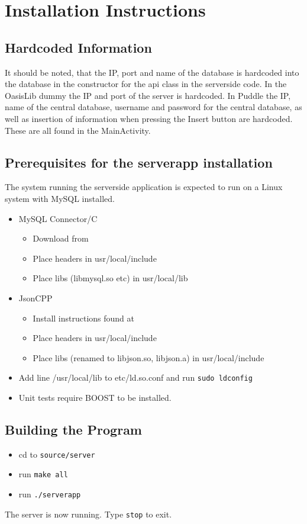 \section{Installation Instructions}

\subsection{Hardcoded Information}
It should be noted, that the IP, port and name of the database is hardcoded into the database in the constructor for the \ac{api} class in the serverside code. In the OasisLib dummy the IP and port of the server is hardcoded. In Puddle the IP, name of the central database, username and password for the central database, as well as insertion of information when pressing the Insert button are hardcoded. These are all found in the MainActivity.

\subsection{Prerequisites for the serverapp installation}
The system running the serverside application is expected to run on a Linux system with MySQL installed.

\begin{itemize}
\item MySQL Connector/C
\begin{itemize}
	\item Download from \cite{mysqlconnector}
	\item Place headers in usr/local/include
	\item Place libs (libmysql.so etc) in usr/local/lib
\end{itemize}
\item JsonCPP
\begin{itemize}
	\item Install instructions found at \citep{jsoncppinstall}
	\item Place headers in usr/local/include
	\item Place libs (renamed to libjson.so, libjson.a) in usr/local/include
\end{itemize}
\item Add line /usr/local/lib to etc/ld.so.conf and run \lstinline|sudo ldconfig|
\item Unit tests require BOOST to be installed.\citep{boostinstall}
\end{itemize}

\subsection{Building the Program}
\begin{itemize}
\item cd to \lstinline|source/server|
\item run \lstinline|make all|
\item run \lstinline|./serverapp|
\end{itemize}
The server is now running. Type \lstinline|stop| to exit.


